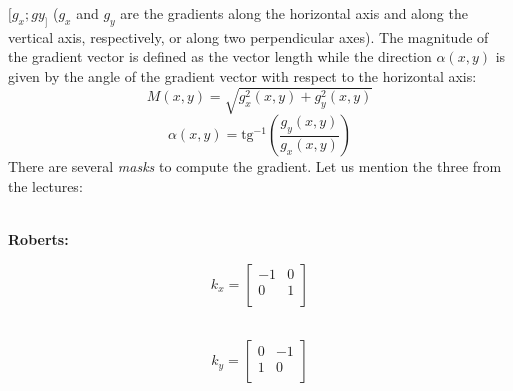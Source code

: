 \documentclass[a4paper,11pt]{article}
\begin{document}
$[g_x; gy_]$ ($g_x$ and $g_y$ are the gradients along the horizontal axis and along the vertical axis, respectively, or along two perpendicular axes). 
The magnitude of the gradient vector is defined as the vector length while the direction $\alpha(x,y)$ is given by the angle of the gradient vector with respect to the horizontal axis:
$$
M(x, y) = \sqrt{g_x^2(x, y) + g_y^2(x, y)}
$$
$$
\alpha(x, y) = \text{tg}^{-1} \left( \frac{g_y(x, y)}{g_x(x, y)} \right)
$$
There are several \textit{masks} to compute the gradient. Let us mention the three from the lectures:
\\
\\
\begin{minipage}{0.2\textwidth}
    \centering
    \textbf{Roberts:}
\end{minipage}\hfill
\begin{minipage}{0.3\textwidth}
    \begin{equation*}
        k_x = 
        \begin{bmatrix}
        -1 & 0  \\
        0 & 1 \\
        \end{bmatrix}
    \end{equation*}
    \\
\end{minipage}\hfill
\begin{minipage}{0.4\textwidth}
    \begin{equation*}
        k_y = 
        \begin{bmatrix}
        0 & -1 \\
        1 & 0 \\
        \end{bmatrix}
    \end{equation*}
    \\
\end{minipage}\hfill
\end{document}
